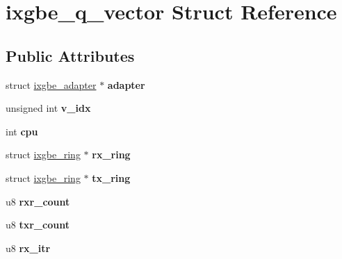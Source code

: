 \hypertarget{structixgbe__q__vector}{
\section{ixgbe\_\-q\_\-vector Struct Reference}
\label{structixgbe__q__vector}
}
\subsection*{Public Attributes}
\begin{DoxyCompactItemize}
\item 
\hypertarget{structixgbe__q__vector_a78c5c713d555762bc996d6bc892ad9c3}{
struct \hyperlink{structixgbe__adapter}{ixgbe\_\-adapter} $\ast$ {\bfseries adapter}}
\label{structixgbe__q__vector_a78c5c713d555762bc996d6bc892ad9c3}

\item 
\hypertarget{structixgbe__q__vector_adc9fbcba4d45d83d01fcb566de852129}{
unsigned int {\bfseries v\_\-idx}}
\label{structixgbe__q__vector_adc9fbcba4d45d83d01fcb566de852129}

\item 
\hypertarget{structixgbe__q__vector_ae64b272716c2817ac789b2afb853d3f7}{
int {\bfseries cpu}}
\label{structixgbe__q__vector_ae64b272716c2817ac789b2afb853d3f7}

\item 
\hypertarget{structixgbe__q__vector_ad5fa8e512abed014dd4d56b77b394890}{
struct \hyperlink{structixgbe__ring}{ixgbe\_\-ring} $\ast$ {\bfseries rx\_\-ring}}
\label{structixgbe__q__vector_ad5fa8e512abed014dd4d56b77b394890}

\item 
\hypertarget{structixgbe__q__vector_a8ef3a4d757a1e70cde7897094e0878ed}{
struct \hyperlink{structixgbe__ring}{ixgbe\_\-ring} $\ast$ {\bfseries tx\_\-ring}}
\label{structixgbe__q__vector_a8ef3a4d757a1e70cde7897094e0878ed}

\item 
\hypertarget{structixgbe__q__vector_a52c82d1c67eab2f640a1f9a5a5ce83c5}{
u8 {\bfseries rxr\_\-count}}
\label{structixgbe__q__vector_a52c82d1c67eab2f640a1f9a5a5ce83c5}

\item 
\hypertarget{structixgbe__q__vector_abfeae1a4104c12679e53ca7324bd03a2}{
u8 {\bfseries txr\_\-count}}
\label{structixgbe__q__vector_abfeae1a4104c12679e53ca7324bd03a2}

\item 
\hypertarget{structixgbe__q__vector_a79402b0f9d4123691b7cda6b10747df9}{
u8 {\bfseries rx\_\-itr}}
\label{structixgbe__q__vector_a79402b0f9d4123691b7cda6b10747df9}


\end{DoxyCompactItemize}
